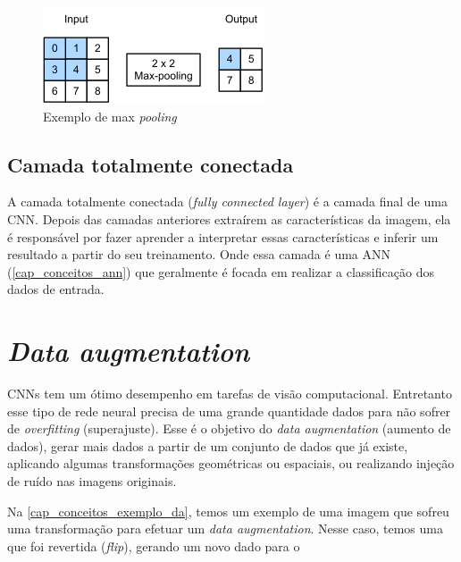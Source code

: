 \begin{figure}[htb]
	\caption {\label{exemplo_pooling} Exemplo de max \textit{pooling}}
	\begin{center}
		\includegraphics[scale=1.0]{Imagens/maxpooling}
	\end{center}
\end{figure}

\subsection{Camada totalmente conectada}\label{cap_conceitos_cnn_totalmente}
A camada totalmente conectada (\textit{fully connected layer}) é a camada final de uma CNN.
Depois das camadas anteriores extraírem as características da imagem, ela é responsável por
fazer aprender a interpretar essas características e inferir um resultado a partir do seu treinamento.
Onde essa camada é uma ANN (\autoref{cap_conceitos_ann}) que geralmente é focada em realizar a classificação dos dados
de entrada.

\section{\textit{Data augmentation}}\label{cap_conceitos_data_augmentation}
CNNs tem um ótimo desempenho em tarefas de visão computacional. Entretanto esse tipo de rede neural precisa de uma
grande quantidade dados para não sofrer de \textit{overfitting} (superajuste). \cite{shorten2019survey}
Esse é o objetivo do \textit{data augmentation} (aumento de dados), gerar mais dados a partir de um conjunto de dados
que já existe, aplicando algumas transformações geométricas ou espaciais, ou realizando injeção de ruído nas imagens
originais.

Na \autoref{cap_conceitos_exemplo_da}, temos um exemplo de uma imagem que sofreu uma transformação para efetuar um \textit{data augmentation}.
Nesse caso, temos uma que foi revertida (\textit{flip}), gerando um novo dado para o 

